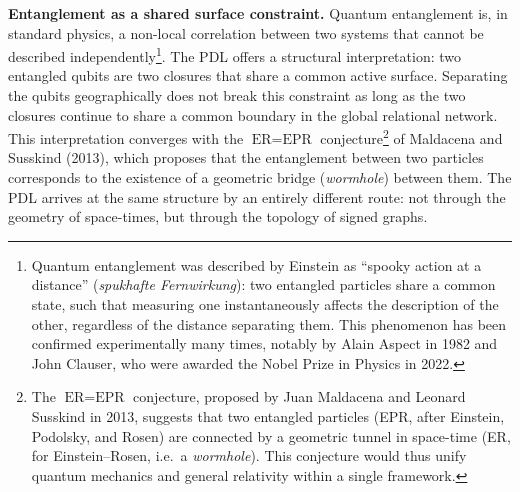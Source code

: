 \documentclass[12pt, a4paper, openright]{book}
\begin{document}
\medskip

\textbf{Entanglement as a shared surface constraint.} Quantum entanglement is, in standard physics, a non-local correlation between two systems that cannot be described independently\footnote{Quantum entanglement was described by Einstein as ``spooky action at a distance'' (\textit{spukhafte Fernwirkung}): two entangled particles share a common state, such that measuring one instantaneously affects the description of the other, regardless of the distance separating them. This phenomenon has been confirmed experimentally many times, notably by Alain Aspect in 1982 and John Clauser, who were awarded the Nobel Prize in Physics in 2022.}. The PDL offers a structural interpretation: two entangled qubits are two closures that share a common active surface. Separating the qubits geographically does not break this constraint as long as the two closures continue to share a common boundary in the global relational network. This interpretation converges with the $\text{ER} = \text{EPR}$ conjecture\footnote{The $\text{ER} = \text{EPR}$ conjecture, proposed by Juan Maldacena and Leonard Susskind in 2013, suggests that two entangled particles (EPR, after Einstein, Podolsky, and Rosen) are connected by a geometric tunnel in space-time (ER, for Einstein--Rosen, i.e.\ a \textit{wormhole}). This conjecture would thus unify quantum mechanics and general relativity within a single framework.} of Maldacena and Susskind (2013), which proposes that the entanglement between two particles corresponds to the existence of a geometric bridge (\emph{wormhole}) between them. The PDL arrives at the same structure by an entirely different route: not through the geometry of space-times, but through the topology of signed graphs.

\medskip
\end{document}
